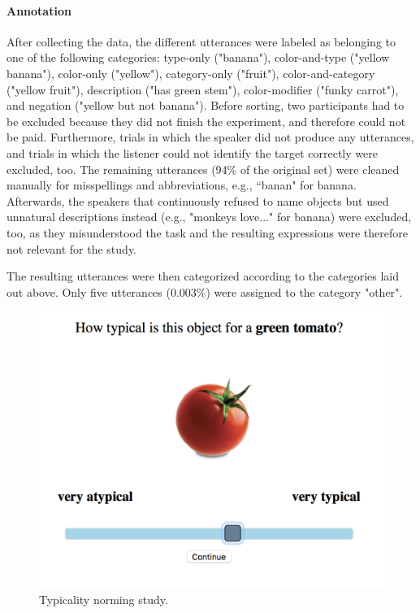 \documentclass[10pt,letterpaper]{article}
\begin{document}
\paragraph{Annotation}
After collecting the data, the different utterances were labeled as belonging to one of the following categories: type-only ("banana"), color-and-type ("yellow banana"),  color-only ("yellow"), category-only ("fruit"), color-and-category ("yellow fruit"), description ("has green stem"), color-modifier ("funky carrot"), and negation ("yellow but not banana"). Before sorting, two participants had to be excluded because they did not finish the experiment, and therefore could not be paid. Furthermore, trials in which the speaker did not produce any utterances, and trials in which the listener could not identify the target correctly were excluded, too. The remaining utterances (94\% of the original set) were cleaned manually for misspellings and abbreviations, e.g., ``banan" for banana. Afterwards, the speakers that continuously refused to name objects but used unnatural descriptions instead (e.g., "monkeys love..." for banana) were excluded, too, as they misunderstood the task and the resulting expressions were therefore not relevant for the study.

The resulting utterances were then categorized according to the categories laid out above. Only five utterances (0.003\%) were assigned to the category "other".


\begin{figure}[bt!]
	\centering
	\includegraphics[width=.5\textwidth]{graphs/typ_norm_full_2}
	\caption{Typicality norming study.
	}
	\label{fig:typ_norm_full_2}
\end{figure}
\end{document}
